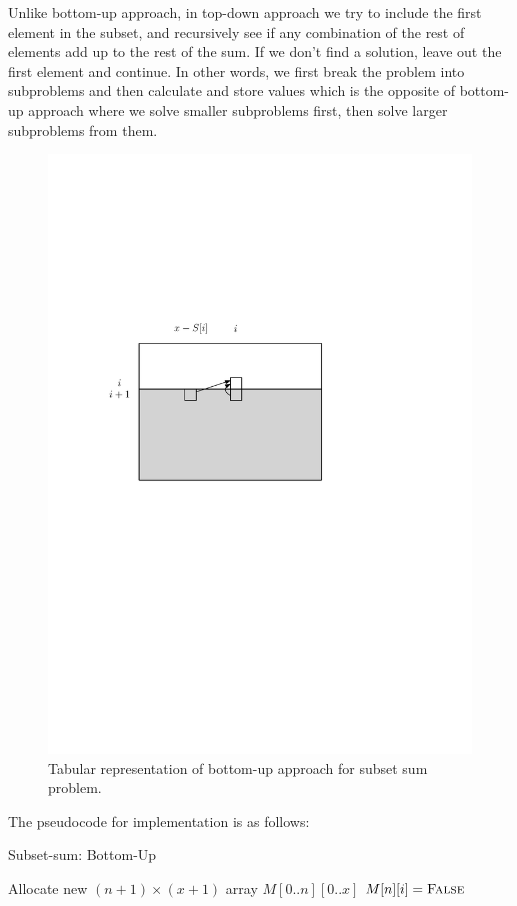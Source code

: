 \documentclass[11pt]{article}
\theoremstyle{definition}
\begin{document}
Unlike bottom-up approach, in top-down approach we try to include the first element in the subset, and recursively see if any combination of the rest of elements add up to the rest of the sum. If we don't find a solution, leave out the first element and continue. In other words, we first break the problem into subproblems and then calculate and store values which is the opposite of bottom-up approach where we solve smaller subproblems first, then solve larger subproblems from them.
\begin{figure}[tbh]
\centering
\includegraphics[scale=0.8]{figures/BottomUp.pdf}
\caption{Tabular representation of bottom-up approach for subset sum problem.}
\label{fig:bottom-up}
\end{figure}

The pseudocode for implementation is as follows:
\begin{algorithm}[H]
\caption{Subset-sum: Bottom-Up}\label{Subset-sum:BU}
\begin{algorithmic}[1]
\State Allocate new $(n+1)\times (x+1)$ array $M[0..n][0..x]$
\State $M[n][i]=\Call{False}{}$
\EndFor
{}
    \EndFor
\EndFor
\State{}
\EndFunction
\end{algorithmic}
\end{algorithm}
\end{document}
